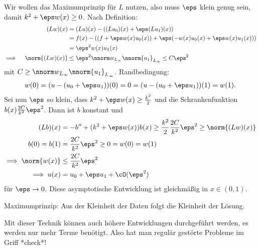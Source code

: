 \begin{beispiel}
Wir wollen das Maximumprinzip für $L$ nutzen, also muss $\eps$ klein genug sein, damit $k^{2} + \eps w(x) \geq 0$. Nach Definition:
\begin{align*}
  (Lw)(x) &= (Lu)(x) - ((Lu_{0})(x) + \eps(Lu_{1})(x))\\
  &= f(x) - ((f + \eps w(x) u_{0}(x)) + \eps(-w(x)u_{0}(x) + \eps w(x)u_{1}(x)))\\
  &= \eps^{2} w(x) u_{1}(x)\\
\implies \quad \norm{(Lw)(x)}&\leq \eps^{2}\nnorm w_{L_{\infty}} \nnorm {u_{1}}_{L_{\infty}} \leq C \eps ^{2}
\end{align*}
mit $C \geq \nnorm w_{L_{\infty}} \nnorm {u_{1}}_{L_{\infty}}$. Randbedingung: 
\begin{align*}
  w(0) = (u- (u_{0} + \eps u_{1}))(0) = 0=   (u- (u_{0} + \eps u_{1}))(1) = w(1). 
\end{align*}
Sei nun $\eps$ so klein, dass $k^{2} + \eps w(x) \geq \frac {k^{2}}2$ und die Schrankenfunktion $b(x) \frac{2C}{k^{2}}\eps^{2}$. Dann ist $b$ konstant und
\begin{align*}
  (Lb)(x) &= - b'' + (k^{2} + \eps w(x))b(x) \geq \frac {k^{2}} 2 \frac{2C}{k^{2}} \eps^{2} \geq \norm{(Lw)(x)}\\
  b(0) = b(1) &= \frac{2C}{k^{2}} \eps^{2} \geq 0 = w(0) = w(1)\\
\implies \norm{w(x)} &\leq \frac{2C}{k^{2}}\eps^{2}\\
\implies u(x) &= u_{0} + \eps u_{1} + \cO(\eps^{2})
\end{align*}
für $\eps \to 0$. Diese asymptotische Entwicklung ist gleichmäßig in $x \in (0, 1)$. 
\end{beispiel}
Maximumprinzip: Aus der Kleinheit der Daten folgt die Kleinheit der Lösung. 

Mit dieser Technik können auch höhere Entwicklungen durchgeführt werden, es werden nur mehr Terme benötigt. Also hat man regulär gestörte Probleme im Griff *check*!
